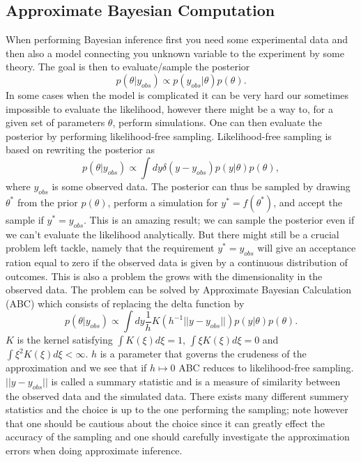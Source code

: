 \documentclass[11pt,a4paper]{article}
\begin{document}
\subsection[Task 4]{Approximate Bayesian Computation}
\label{sec:method_ABC}
When performing Bayesian inference first you need some experimental data and then also a model connecting you unknown variable to the experiment by some theory. The goal is then to evaluate/sample the posterior
\begin{equation*}
    p(\theta|y_{obs}) \propto p(y_{obs}|\theta) p(\theta).
\end{equation*}
In some cases when the model is complicated it can be very hard our sometimes impossible to evaluate the likelihood, however there might be a way to, for a given set of parameters $\theta$, perform simulations. One can then evaluate the posterior by performing likelihood-free sampling. Likelihood-free sampling is based on rewriting the posterior as
\begin{equation*}
    p(\theta|y_{obs}) \propto \int d y \delta(y-y_{obs})p(y|\theta) p(\theta),
\end{equation*}
where $y_{obs}$ is some observed data. The posterior can thus be sampled by drawing $\theta^*$ from the prior $p(\theta)$, perform a simulation for $y^*  = f(\theta^*)$, and accept the sample if $y^* = y_{obs}$. This is an amazing result; we can sample the posterior even if we can't evaluate the likelihood analytically. But there might still be a crucial problem left tackle, namely that the requirement  $y^* = y_{obs}$ will give an acceptance ration equal to zero if the observed data is given by a continuous distribution of outcomes. This is also a problem the grows with the dimensionality in the observed data. The problem can be solved by Approximate Bayesian Calculation (ABC) which consists of replacing the delta function by 
\begin{equation*}
    p(\theta|y_{obs}) \propto \int d y \frac{1}{h}K\left(h^{-1}{||y - y_{obs}||}\right) p(y|\theta) p(\theta).
\end{equation*}
$K$ is the kernel satisfying $\int K(\xi)d\xi = 1$, $\int\xi K(\xi)d\xi = 0$ and $\int \xi^2K(\xi)d\xi < \infty$. $h$ is a parameter that governs the crudeness of the approximation and we see that if $h\mapsto 0$ ABC reduces to likelihood-free sampling. $||y - y_{obs}||$ is called a summary statistic and is a measure of similarity between the observed data and the simulated data. There exists many different summery statistics and the choice is up to the one performing the sampling; note however that one should be cautious about the choice since it can greatly effect the accuracy of the sampling and one should carefully investigate the approximation errors when doing approximate inference.
\end{document}
